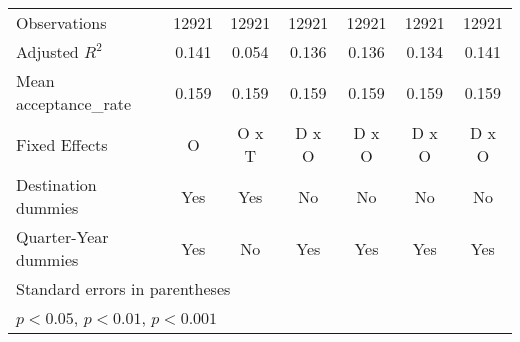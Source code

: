 \begin{table}[htbp]
\begin{tabular}{l*{6}{c}}
\hline
Observations        &       12921         &       12921         &       12921         &       12921         &       12921         &       12921         \\
Adjusted \(R^{2}\)  &       0.141         &       0.054         &       0.136         &       0.136         &       0.134         &       0.141         \\
Mean acceptance\_rate&       0.159         &       0.159         &       0.159         &       0.159         &       0.159         &       0.159         \\
Fixed Effects       &           O         &       O x T         &       D x O         &       D x O         &       D x O         &       D x O         \\
Destination dummies &         Yes         &         Yes         &          No         &          No         &          No         &          No         \\
Quarter-Year dummies&         Yes         &          No         &         Yes         &         Yes         &         Yes         &         Yes         \\
\hline\hline
\multicolumn{7}{l}{\footnotesize Standard errors in parentheses}\\
\multicolumn{7}{l}{\footnotesize \sym{*} \(p<0.05\), \sym{**} \(p<0.01\), \sym{***} \(p<0.001\)}\\
\end{tabular}
\end{table}
